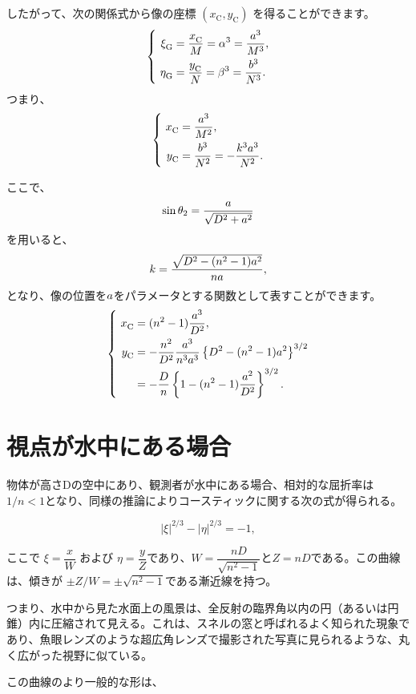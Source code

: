 \documentclass[twocolumn]{article}
\begin{document}
	したがって、次の関係式から像の座標 $(x_{\mathrm{C}}^{}, y_{\mathrm{C}}^{})$ を得ることができます。
	$$ \left\{ 
	\begin{aligned}
		\xi_{\mathrm{G}}^{} &= \dfrac{x_{\mathrm{C}}^{}}{M} = \greeka^3 = \dfrac{\romana^3}{M^3},\\
		\eta_{\mathrm{G}}^{} &= \dfrac{y_{\mathrm{C}}^{}}{N} = \greekb^3 = \dfrac{\romanb^3}{N^3}.
	\end{aligned}
	\right.$$
	つまり、
	$$ \left\{ 
	\begin{aligned}
		x_{\mathrm{C}}^{} &= \dfrac{\romana^3}{M^2},\\
		y_{\mathrm{C}}^{} &= \dfrac{\romanb^3}{N^2}=-\dfrac{k^3\romana^3}{N^2}.
	\end{aligned}
	\right.$$
	
	ここで、
	$$\sin\theta_2 = \dfrac{{a}}{\sqrt{D^2+{a}^2}}$$
	を用いると、
	$$k = \dfrac{\sqrt{D^2-(n^2-1){a}^2}}{n{a}},$$
	となり、像の位置を${a}$をパラメータとする関数として表すことができます。
	$$ \left\{ 
	\begin{aligned}
		x_{\mathrm{C}}^{} &= (n^2-1)\dfrac{\romana^3}{D^2},\\
		y_{\mathrm{C}}^{} &= -\dfrac{n^2}{D^2}\dfrac{\romana^3}
		{n^3\romana^3}\left\{ D^2-(n^2-1)\romana^2 \right\}^{3/2}\\
		&=-\dfrac{D}{n}\left\{ 1-(n^2-1)\dfrac{\romana^2}{D^2} \right\}^{3/2}.
	\end{aligned}
	\right.$$
	
	\section{視点が水中にある場合}
	
	物体が高さDの空中にあり、観測者が水中にある場合、相対的な屈折率は$1/n < 1$となり、同様の推論によりコースティックに関する次の式が得られる。
	
	$$ \left| \xi \right|^{2/3} - \left| \eta \right|^{2/3} = -1, $$
	
	ここで $\xi = \dfrac{x}{W} $ および $\eta = \dfrac{y}{Z}$であり、$W = \dfrac{nD}{\sqrt{n^2-1}}$と$Z = nD$である。この曲線は、傾きが $\pm Z/W = \pm \sqrt{n^2-1}$である漸近線を持つ。
	
	つまり、水中から見た水面上の風景は、全反射の臨界角以内の円（あるいは円錐）内に圧縮されて見える。これは、スネルの窓と呼ばれるよく知られた現象であり、魚眼レンズのような超広角レンズで撮影された写真に見られるような、丸く広がった視野に似ている。
	
	この曲線のより一般的な形は、
	
\end{document}
